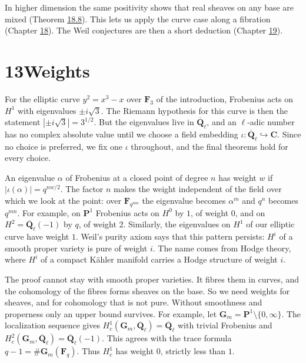 \documentclass[11pt]{article}
\begin{document}
In higher dimension the same positivity shows that real sheaves on any base are mixed (Theorem \hyperref[bp295]{18.8}). This lets us apply the curve case along a fibration (Chapter \hyperref[bp271]{18}). The Weil conjectures are then a short deduction (Chapter \hyperref[bp319]{19}).

\section*{\texorpdfstring{13\quad Weights}{13 Weights}}
\label{bp3}%
\label{bp4}%
For the elliptic curve \(y^2=x^3-x\) over \(\mathbf F_3\) of the introduction, Frobenius acts on \(H^1\) with eigenvalues \(\pm i\sqrt3\). The Riemann hypothesis for this curve is then the statement \(|\pm i\sqrt3|=3^{1/2}\). But the eigenvalues live in \(\overline{\mathbf Q}_\ell\), and an \(\ell\)-adic number has no complex absolute value until we choose a field embedding \(\iota:\overline{\mathbf Q}_\ell\hookrightarrow\mathbf C\). Since no choice is preferred, we fix one \(\iota\) throughout, and the final theorems hold for every choice.

An eigenvalue \(\alpha\) of Frobenius at a closed point of degree \(n\) has weight \(w\) if \(|\iota(\alpha)|=q^{nw/2}\). The factor \(n\) makes the weight independent of the field over which we look at the point: over \(\mathbf F_{q^{mn}}\) the eigenvalue becomes \(\alpha^m\) and \(q^n\) becomes \(q^{mn}\). For example, on \(\mathbf P^1\) Frobenius acts on \(H^0\) by \(1\), of weight \(0\), and on \(H^2=\overline{\mathbf Q}_\ell(-1)\) by \(q\), of weight \(2\). Similarly, the eigenvalues on \(H^1\) of our elliptic curve have weight \(1\). Weil's purity axiom says that this pattern persists: \(H^i\) of a smooth proper variety is pure of weight \(i\). The name comes from Hodge theory, where \(H^i\) of a compact Kähler manifold carries a Hodge structure of weight \(i\).

The proof cannot stay with smooth proper varieties. It fibres them in curves, and the cohomology of the fibres forms sheaves on the base. So we need weights for sheaves, and for cohomology that is not pure. Without smoothness and properness only an upper bound survives. For example, let \(\mathbf G_m=\mathbf P^1\setminus\{0,\infty\}\). The localization sequence gives \(H^1_c(\mathbf G_m,\overline{\mathbf Q}_\ell)=\overline{\mathbf Q}_\ell\) with trivial Frobenius and \(H^2_c(\mathbf G_m,\overline{\mathbf Q}_\ell)=\overline{\mathbf Q}_\ell(-1)\). This agrees with the trace formula \(q-1=\#\mathbf G_m(\mathbf F_q)\). Thus \(H^1_c\) has weight \(0\), strictly less than \(1\).
\end{document}
